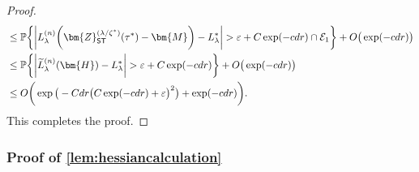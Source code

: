 \documentclass[10pt]{article}
\newcommand{\eps}{\ensuremath{\varepsilon}}
\newcommand{\s}{^*}
\newcommand{\p}{\mathbb{P}}
\renewcommand{\tilde}{\widetilde}
\theoremstyle{definition}
\begin{document}
\begin{proof}
\begin{align}
&\leq \p\bigg\{ \bigg|    L_{\lambda}^{(n)} \bigg( \bm{Z}_{{\sf ST}}^{(\lambda/\zeta\s)}(\tau\s) - \bm{M} \bigg) - L_{\lambda}^* \bigg| > \eps+ C \exp( - c d r) \cap \mathcal{E}_1 \bigg\} + O\big(\exp( - c dr ) \big)\\
&\leq \p\bigg\{ \bigg|    \tilde L_{\lambda}^{(n)} (\bm{H})  - L_{\lambda}^* \bigg| > \eps + C \exp( - c d r)   \bigg\} + O\big(\exp( - c dr ) \big) \\
&\leq O\bigg( \exp\big( - C dr \big( C \exp(- c dr) + \eps \big)^2 \big) + \exp( - c dr) \bigg).
\end{align}
This completes the proof.
\end{proof}



\subsubsection{Proof of \cref{lem:hessiancalculation}}  \label{sec:hessiancalculationproof}
\end{document}
